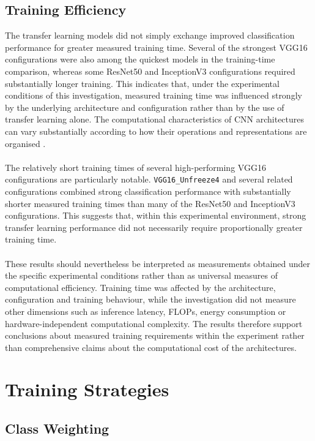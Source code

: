 \documentclass[12pt, a4paper]{report}
\let\oldsection\section
\renewcommand{\section}{%
    \Needspace{6\baselineskip}%
    \oldsection
}
\let\oldsubsection\subsection
\renewcommand{\subsection}{%
    \Needspace{6\baselineskip}%
    \oldsubsection
}
\begin{document}
			\newpage
			\subsection{Training Efficiency}
				
				The transfer learning models did not simply exchange improved classification performance for greater measured training time. Several of the strongest VGG16 configurations were also among the quickest models in the training-time comparison, whereas some ResNet50 and InceptionV3 configurations required substantially longer training. This indicates that, under the experimental conditions of this investigation, measured training time was influenced strongly by the underlying architecture and configuration rather than by the use of transfer learning alone. The computational characteristics of CNN architectures can vary substantially according to how their operations and representations are organised \cite{tompson2015efficient, Liao2024RSXception}.\\\\
				The relatively short training times of several high-performing VGG16 configurations are particularly notable. \texttt{VGG16\_Unfreeze4} and several related configurations combined strong classification performance with substantially shorter measured training times than many of the ResNet50 and InceptionV3 configurations. This suggests that, within this experimental environment, strong transfer learning performance did not necessarily require proportionally greater training time.\\\\
				These results should nevertheless be interpreted as measurements obtained under the specific experimental conditions rather than as universal measures of computational efficiency. Training time was affected by the architecture, configuration and training behaviour, while the investigation did not measure other dimensions such as inference latency, FLOPs, energy consumption or hardware-independent computational complexity. The results therefore support conclusions about measured training requirements within the experiment rather than comprehensive claims about the computational cost of the architectures.
				
		\section{Training Strategies}
			
			\subsection{Class Weighting}
				
\end{document}
